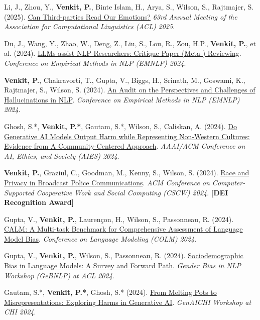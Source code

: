 {\begin{cvitems}
  \item {Li, J., Zhou, Y., \textbf{Venkit, P.}, Binte Islam, H., Arya, S., Wilson, S., Rajtmajer, S. (2025). \href{https://aclanthology.org/2025.acl-long.1042/}{Can Third-parties Read Our Emotions?} \textit{63rd Annual Meeting of the Association for Computational Linguistics (ACL) 2025}.}
  \item {Du, J., Wang, Y., Zhao, W., Deng, Z., Liu, S., Lou, R., Zou, H.P., \textbf{Venkit, P.}, et al. (2024). \href{https://aclanthology.org/2024.emnlp-main.292/}{LLMs assist NLP Researchers: Critique Paper (Meta-) Reviewing}. \textit{Conference on Empirical Methods in NLP (EMNLP) 2024}.}
  \item {\textbf{Venkit, P.}, Chakravorti, T., Gupta, V., Biggs, H., Srinath, M., Goswami, K., Rajtmajer, S., Wilson, S. (2024). \href{https://aclanthology.org/2024.emnlp-main.375.pdf}{An Audit on the Perspectives and Challenges of Hallucinations in NLP}. \textit{Conference on Empirical Methods in NLP (EMNLP) 2024}.}
  \item {Ghosh, S.*, \textbf{Venkit, P.*}, Gautam, S.*, Wilson, S., Caliskan, A. (2024). \href{https://ojs.aaai.org/index.php/AIES/article/view/31651}{Do Generative AI Models Output Harm while Representing Non-Western Cultures: Evidence from A Community-Centered Approach}. \textit{AAAI/ACM Conference on AI, Ethics, and Society (AIES) 2024}.}
  \item {\textbf{Venkit, P.}, Graziul, C., Goodman, M., Kenny, S., Wilson, S. (2024). \href{https://dl.acm.org/doi/abs/10.1145/3686921}{Race and Privacy in Broadcast Police Communications}. \textit{ACM Conference on Computer-Supported Cooperative Work and Social Computing (CSCW) 2024}. \textbf{[DEI Recognition Award]}}
  \item {Gupta, V., \textbf{Venkit, P.}, Laurençon, H., Wilson, S., Passonneau, R. (2024). \href{https://openreview.net/pdf?id=BdeBSdwfvh}{CALM: A Multi-task Benchmark for Comprehensive Assessment of Language Model Bias}. \textit{Conference on Language Modeling (COLM) 2024}.}
  \item {Gupta, V., \textbf{Venkit, P.}, Wilson, S., Passonneau, R. (2024). \href{https://scholar.google.com/scholar?q=Sociodemographic\%20Bias\%20in\%20Language\%20Models\%3A\%20A\%20Survey\%20and\%20Forward\%20Path}{Sociodemographic Bias in Language Models: A Survey and Forward Path}. \textit{Gender Bias in NLP Workshop (GeBNLP) at ACL 2024}.}
  \item {Gautam, S.*, \textbf{Venkit, P.*}, Ghosh, S.* (2024). \href{https://generativeaiandhci.github.io/papers/2024/genaichi2024_34.pdf}{From Melting Pots to Misrepresentations: Exploring Harms in Generative AI}. \textit{GenAICHI Workshop at CHI 2024}.}

\end{cvitems}}
